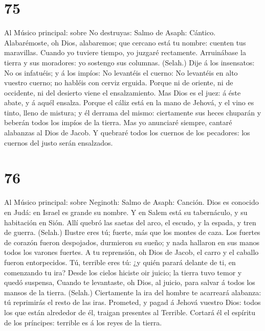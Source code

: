 \hypertarget{section-74}{%
\section{75}\label{section-74}}

 Al Músico principal: sobre No destruyas: Salmo de Asaph:
Cántico. Alabarémoste, oh Dios, alabaremos; que cercano está tu nombre:
cuenten tus maravillas.  Cuando yo tuviere tiempo, yo
juzgaré rectamente.  Arruinábase la tierra y sus
moradores: yo sostengo sus columnas. (Selah.)  Dije á los
insensatos: No os infatuéis; y á los impíos: No levantéis el cuerno:
 No levantéis en alto vuestro cuerno; no habléis con
cerviz erguida.  Porque ni de oriente, ni de occidente, ni
del desierto viene el ensalzamiento.  Mas Dios es el juez:
á éste abate, y á aquél ensalza.  Porque el cáliz está en
la mano de Jehová, y el vino es tinto, lleno de mistura; y él derrama
del mismo: ciertamente sus heces chuparán y beberán todos los impíos de
la tierra.  Mas yo anunciaré siempre, cantaré alabanzas al
Dios de Jacob.  Y quebraré todos los cuernos de los
pecadores: los cuernos del justo serán ensalzados.

\hypertarget{section-75}{%
\section{76}\label{section-75}}

 Al Músico principal: sobre Neginoth: Salmo de Asaph:
Canción. Dios es conocido en Judá: en Israel es grande su nombre.
 Y en Salem está su tabernáculo, y su habitación en Sión.
 Allí quebró las saetas del arco, el escudo, y la espada,
y tren de guerra. (Selah.)  Ilustre eres tú; fuerte, más
que los montes de caza.  Los fuertes de corazón fueron
despojados, durmieron su sueño; y nada hallaron en sus manos todos los
varones fuertes.  A tu reprensión, oh Dios de Jacob, el
carro y el caballo fueron entorpecidos.  Tú, terrible eres
tú: ¿y quién parará delante de ti, en comenzando tu ira? 
Desde los cielos hiciste oir juicio; la tierra tuvo temor y quedó
suspensa,  Cuando te levantaste, oh Dios, al juicio, para
salvar á todos los mansos de la tierra. (Selah.) 
Ciertamente la ira del hombre te acarreará alabanza: tú reprimirás el
resto de las iras.  Prometed, y pagad á Jehová vuestro
Dios: todos los que están alrededor de él, traigan presentes al
Terrible.  Cortará él el espíritu de los príncipes:
terrible es á los reyes de la tierra.

